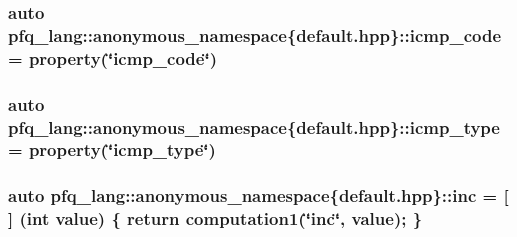 \hypertarget{namespacepfq__lang_1_1anonymous__namespace_02default_8hpp_03_aad0f666aca065f5aaf283857e5c933ce}{
\subsubsection[{icmp\-\_\-code}]{\setlength{\rightskip}{0pt plus 5cm}auto pfq\-\_\-lang\-::anonymous\-\_\-namespace\{default.\-hpp\}\-::icmp\-\_\-code = {\bf property}(\char`\"{}icmp\-\_\-code\char`\"{})}}\label{namespacepfq__lang_1_1anonymous__namespace_02default_8hpp_03_aad0f666aca065f5aaf283857e5c933ce}
\hypertarget{namespacepfq__lang_1_1anonymous__namespace_02default_8hpp_03_a4adff7ced08caa2d0016a911dae6d2ed}{
\subsubsection[{icmp\-\_\-type}]{\setlength{\rightskip}{0pt plus 5cm}auto pfq\-\_\-lang\-::anonymous\-\_\-namespace\{default.\-hpp\}\-::icmp\-\_\-type = {\bf property}(\char`\"{}icmp\-\_\-type\char`\"{})}}\label{namespacepfq__lang_1_1anonymous__namespace_02default_8hpp_03_a4adff7ced08caa2d0016a911dae6d2ed}
\hypertarget{namespacepfq__lang_1_1anonymous__namespace_02default_8hpp_03_a14246183085ec07f08ab9b0d53907ae5}{
\subsubsection[{inc}]{\setlength{\rightskip}{0pt plus 5cm}auto pfq\-\_\-lang\-::anonymous\-\_\-namespace\{default.\-hpp\}\-::inc = \mbox{[}$\,$\mbox{]} (int value) \{ return {\bf computation1}(\char`\"{}inc\char`\"{}, value); \}}}\label{namespacepfq__lang_1_1anonymous__namespace_02default_8hpp_03_a14246183085ec07f08ab9b0d53907ae5}
